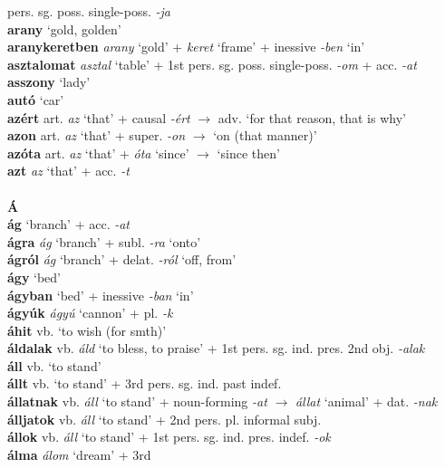 \documentclass[11pt]{article}
\begin{document}
pers. sg. poss. single\hyp{}poss. \emph{-ja} \\
\textbf{arany} `gold, golden' \\
\textbf{aranykeretben} \emph{arany} `gold' + \emph{keret} `frame' +
inessive \emph{-ben} `in' \\
\textbf{asztalomat} \emph{asztal} `table' + 1st
pers. sg. poss. single\hyp{}poss. \emph{-om} + acc. \emph{-at} \\
\textbf{asszony} `lady' \\
\textbf{autó} `car' \\
\textbf{azért} art. \emph{az} `that' + causal \emph{-ért}
$\rightarrow$ adv. `for that reason, that is why' \\
\textbf{azon} art. \emph{az} `that' + super. \emph{-on}
$\rightarrow$ `on (that manner)' \\
\textbf{azóta} art. \emph{az} `that' + \emph{óta} `since'
$\rightarrow$ `since then' \\
\textbf{azt} \emph{az} `that' + acc. \emph{-t} \\
\ \\
\noindent \textbf{\large Á} \\
\textbf{ág} `branch' + acc. \emph{-at} \\
\textbf{ágra} \emph{ág} `branch' + subl. \emph{-ra}
`onto' \\
\textbf{ágról} \emph{ág} `branch' + delat. \emph{-ról} `off, from' \\
\textbf{ágy} `bed' \\
\textbf{ágyban} `bed' + inessive \emph{-ban} `in' \\
\textbf{ágyúk} \emph{ágyú} `cannon' + pl. \emph{-k} \\
\textbf{áhit} vb. `to wish (for smth)' \\
\textbf{áldalak} vb. \emph{áld} `to bless, to praise' + 1st
pers. sg. ind. pres. 2nd obj. \emph{-alak} \\
\textbf{áll} vb. `to stand' \\
\textbf{állt} vb. `to stand' + 3rd pers. sg. ind. past indef. \\
\textbf{állatnak} vb. \emph{áll} `to stand' +
noun\hyp{}forming \emph{-at} $\rightarrow$ \emph{állat} `animal' +
dat. \emph{-nak} \\
\textbf{álljatok} vb. \emph{áll} `to stand' + 2nd pers. pl. informal
subj. \\
\textbf{állok} vb. \emph{áll} `to stand' + 1st
pers. sg. ind. pres. indef. \emph{-ok} \\
\textbf{álma} \emph{álom} `dream' + 3rd
\end{document}
